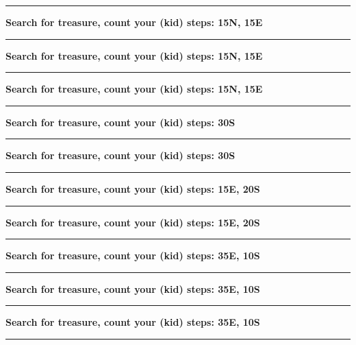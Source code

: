 \documentclass{article}
\begin{document}
\hrule
\vspace{7mm}

\Large\textbf{Search for treasure, count your (kid) steps: 15N, 15E}
\vspace{7mm}

\hrule
\vspace{7mm}

\Large\textbf{Search for treasure, count your (kid) steps: 15N, 15E}
\vspace{7mm}

\hrule
\vspace{7mm}

\Large\textbf{Search for treasure, count your (kid) steps: 15N, 15E}
\vspace{7mm}

\hrule
\vspace{7mm}

\Large\textbf{Search for treasure, count your (kid) steps: 30S}
\vspace{7mm}

\hrule
\vspace{7mm}

\Large\textbf{Search for treasure, count your (kid) steps: 30S}
\vspace{7mm}

\hrule
\vspace{7mm}

\Large\textbf{Search for treasure, count your (kid) steps: 15E, 20S}
\vspace{7mm}

\hrule
\vspace{7mm}

\Large\textbf{Search for treasure, count your (kid) steps: 15E, 20S}
\vspace{7mm}

\hrule
\vspace{7mm}

\Large\textbf{Search for treasure, count your (kid) steps: 35E, 10S}
\vspace{7mm}

\hrule
\vspace{7mm}

\Large\textbf{Search for treasure, count your (kid) steps: 35E, 10S}
\vspace{7mm}

\hrule
\vspace{7mm}

\Large\textbf{Search for treasure, count your (kid) steps: 35E, 10S}
\vspace{7mm}

\hrule
\end{document}
